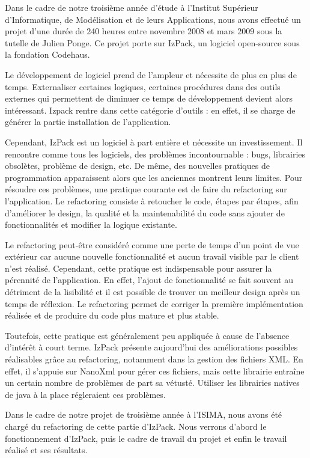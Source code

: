 Dans le cadre de notre troisième année d'étude à l'Institut Supérieur d'Informatique, de Modélisation et de leurs Applications, nous avons effectué un projet d'une durée de 240 heures entre novembre 2008 et mars 2009 sous la tutelle de Julien Ponge.
Ce projet porte sur IzPack, un logiciel open-source sous la fondation Codehaus.

Le développement de logiciel prend de l'ampleur et nécessite de plus en plus de temps.
Externaliser certaines logiques, certaines procédures dans des outils externes qui permettent de diminuer ce temps de développement devient alors intéressant.
Izpack rentre dans cette catégorie d'outils : en effet, il se charge de générer la partie installation de l'application.

Cependant, IzPack est un logiciel à part entière et nécessite un investissement.
Il rencontre comme tous les logiciels, des problèmes incontournable : bugs, librairies obsolètes, problème de design, etc.
De même, des nouvelles pratiques de programmation apparaissent alors que les anciennes montrent leurs limites.
Pour résoudre ces problèmes, une pratique courante est de faire du refactoring sur l'application.
Le refactoring consiste à retoucher le code, étapes par étapes, afin d'améliorer le design, la qualité et la maintenabilité du code sans ajouter de fonctionnalités et modifier la logique existante.

Le refactoring peut-être considéré comme une perte de temps d'un point de vue extérieur car aucune nouvelle fonctionnalité et aucun travail visible par le client n'est réalisé.
Cependant, cette pratique est indispensable pour assurer la pérennité de l'application.
En effet, l'ajout de fonctionnalité se fait souvent au détriment de la lisibilité et il est possible de trouver un meilleur design après un temps de réflexion.
Le refactoring permet de corriger la première implémentation réalisée et de produire du code plus mature et plus stable.

Toutefois, cette pratique est généralement peu appliquée à cause de l'absence d'intérêt à court terme.
IzPack présente aujourd'hui des améliorations possibles réalisables grâce au refactoring, notamment dans la gestion des fichiers XML.
En effet, il s'appuie sur NanoXml pour gérer ces fichiers, mais cette librairie entraîne un certain nombre de problèmes de part sa vétusté.
Utiliser les librairies natives de java à la place régleraient ces problèmes.

Dans le cadre de notre projet de troisième année à l'ISIMA, nous avons été chargé du refactoring de cette partie d'IzPack.
Nous verrons d'abord le fonctionnement d'IzPack, puis le cadre de travail du projet et enfin le travail réalisé et ses résultats.